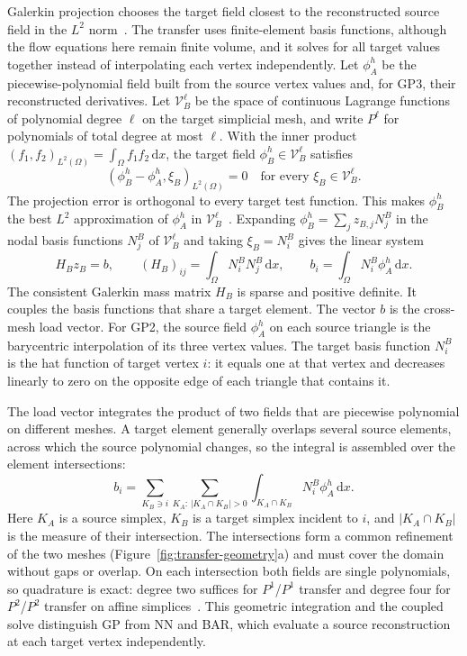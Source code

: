 \documentclass[a4paper,fleqn]{cas-sc}
\newcommand{\dd}{\,\mathrm{d}}
\begin{document}
Galerkin projection chooses the target field closest to the reconstructed source field in the $L^2$ norm~\cite{FarrellMaddison2011,JiaoHeath2004}. The transfer uses finite-element basis functions, although the flow equations here remain finite volume, and it solves for all target values together instead of interpolating each vertex independently. Let $\phi_A^h$ be the piecewise-polynomial field built from the source vertex values and, for GP3, their reconstructed derivatives. Let $\mathcal V_B^\ell$ be the space of continuous Lagrange functions of polynomial degree $\ell$ on the target simplicial mesh, and write $P^\ell$ for polynomials of total degree at most $\ell$. With the inner product $(f_1,f_2)_{L^2(\Omega)}=\int_\Omega f_1f_2\dd x$, the target field $\phi_B^h\in\mathcal V_B^\ell$ satisfies
\begin{equation}
 (\phi_B^h-\phi_A^h,\xi_B)_{L^2(\Omega)}=0
 \quad\text{for every }\xi_B\in\mathcal V_B^\ell.
 \label{eq:galerkin-orthogonality}
\end{equation}
The projection error is orthogonal to every target test function. This makes $\phi_B^h$ the best $L^2$ approximation of $\phi_A^h$ in $\mathcal V_B^\ell$~\cite{FarrellMaddison2011,JiaoHeath2004}. Expanding $\phi_B^h=\sum_jz_{B,j}N_j^B$ in the nodal basis functions $N_j^B$ of $\mathcal V_B^\ell$ and taking $\xi_B=N_i^B$ gives the linear system
\begin{equation}
 H_Bz_B=b,\qquad
 (H_B)_{ij}=\int_\Omega N_i^BN_j^B\dd x,
 \qquad b_i=\int_\Omega N_i^B\phi_A^h\dd x.
 \label{eq:galerkin-system}
\end{equation}
The consistent Galerkin mass matrix $H_B$ is sparse and positive definite. It couples the basis functions that share a target element. The vector $b$ is the cross-mesh load vector. For GP2, the source field $\phi_A^h$ on each source triangle is the barycentric interpolation of its three vertex values. The target basis function $N_i^B$ is the hat function of target vertex $i$: it equals one at that vertex and decreases linearly to zero on the opposite edge of each triangle that contains it.

The load vector integrates the product of two fields that are piecewise polynomial on different meshes. A target element generally overlaps several source elements, across which the source polynomial changes, so the integral is assembled over the element intersections:
\begin{equation}
 b_i=\sum_{K_B\ni i}\sum_{K_A:\,|K_A\cap K_B|>0}
      \int_{K_A\cap K_B}N_i^B\phi_A^h\dd x.
 \label{eq:galerkin-load-intersections}
\end{equation}
Here $K_A$ is a source simplex, $K_B$ is a target simplex incident to $i$, and $|K_A\cap K_B|$ is the measure of their intersection. The intersections form a common refinement of the two meshes (Figure~\ref{fig:transfer-geometry}a) and must cover the domain without gaps or overlap. On each intersection both fields are single polynomials, so quadrature is exact: degree two suffices for $P^1$/$P^1$ transfer and degree four for $P^2$/$P^2$ transfer on affine simplices~\cite{Dunavant1985,Keast1986}. This geometric integration and the coupled solve distinguish GP from NN and BAR, which evaluate a source reconstruction at each target vertex independently.
\end{document}
